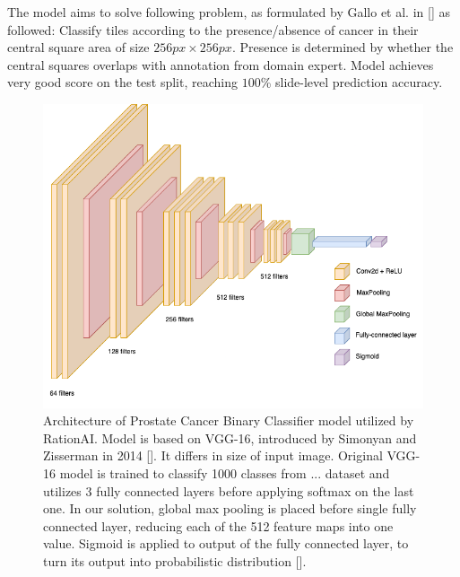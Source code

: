 The model aims to solve following problem, as formulated by Gallo et al. in [] as followed: Classify tiles according to the presence/absence of cancer in their central square area of size $256 px \times 256 px$. Presence is determined by whether the central squares overlaps with annotation from domain expert. Model achieves very good score on the test split, reaching $100$\% slide-level prediction accuracy.

\begin{figure}[!h]
    \begin{center}
    \begin{minipage}{0.75\textwidth}
      \includegraphics[width=\textwidth]{img/nn-arch.png}
    \end{minipage}
    \caption{Architecture of Prostate Cancer Binary Classifier model utilized by RationAI. Model is based on VGG-16, introduced by Simonyan and Zisserman in 2014 []. It differs in size of input image. Original VGG-16 model is trained to classify 1000 classes from ... dataset and utilizes 3 fully connected layers before applying softmax on the last one. In our solution, global max pooling is placed before single fully connected layer, reducing each of the 512 feature maps into one value. Sigmoid is applied to output of the fully connected layer, to turn its output into probabilistic distribution [].}
    \label{fig:rationai-vgg16}
    \end{center}

\end{figure}

